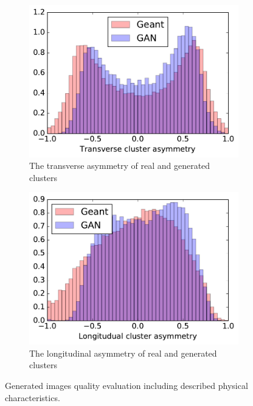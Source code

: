 \begin{figure}
\begin{subfigure}[t]{0.3\textwidth}
    \includegraphics[width=1\textwidth]{figures/transverseAsymmetry.pdf}
    \caption{The transverse asymmetry of real and generated clusters}
  \end{subfigure}\hspace{0.2\textwidth}
  \begin{subfigure}[t]{0.3\textwidth}
    \centering
    \includegraphics[width=1\textwidth]{figures/longAsymmetry.pdf}
    \caption{The longitudinal asymmetry of real and generated clusters}
  \end{subfigure}
  \caption{Generated images quality evaluation including described physical characteristics.}\label{fig:quality}  
\end{figure}

